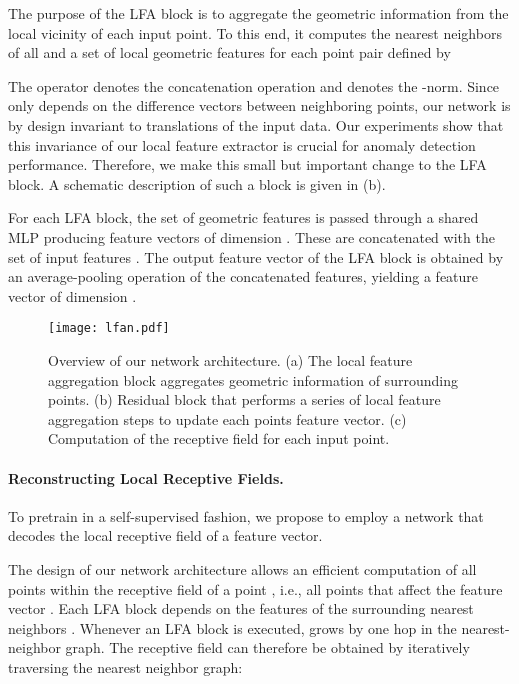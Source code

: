 \documentclass[twoside,11pt]{article}
\begin{document}
The purpose of the LFA block is to aggregate the geometric information from the local vicinity of each input point. To this end, it computes the nearest neighbors  of all  and a set of local geometric features  for each point pair defined by

The operator  denotes the concatenation operation and  denotes the -norm. Since  only depends on the difference vectors between neighboring points, our network is by design invariant to translations of the input data. Our experiments show that this invariance of our local feature extractor is crucial for anomaly detection performance. Therefore, we make this small but important change to the LFA block. A schematic description of such a block is given in (b). 

For each LFA block, the set of geometric features  is passed through a shared MLP producing feature vectors of dimension . These are concatenated with the set of input features . The output feature vector of the LFA block  is obtained by an average-pooling operation of the concatenated features, yielding a feature vector of dimension . 

\begin{figure}[t]
    \centering
\texttt{[image: lfan.pdf]}
    \caption{Overview of our network architecture. (a) The local feature aggregation block aggregates geometric information of surrounding points. (b) Residual block that performs a series of local feature aggregation steps to update each points feature vector. (c) Computation of the receptive field for each input point.}
    \label{fig:network_arch}
\end{figure}

\paragraph{\textbf{Reconstructing Local Receptive Fields.}} To pretrain  in a self-supervised fashion, we propose to employ a network  that decodes the local receptive field of a feature vector.

The design of our network architecture allows an efficient computation of all points within the receptive field  of a point , i.e., all points that affect the feature vector . Each LFA block depends on the features of the surrounding nearest neighbors . Whenever an LFA block is executed,  grows by one hop in the nearest-neighbor graph. The receptive field can therefore be obtained by iteratively traversing the nearest neighbor graph:
  
\end{document}
